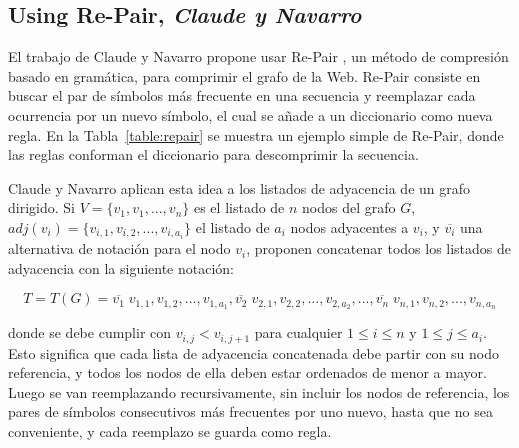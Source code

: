 \subsection{Using Re-Pair, \textit{Claude y Navarro}}
El trabajo de Claude y Navarro \cite{claude2010fast} propone usar Re-Pair \cite{larsson2000off}, un método de compresión basado en gramática, para comprimir el grafo de la Web. Re-Pair consiste en buscar el par de símbolos más frecuente en una secuencia y reemplazar cada ocurrencia por un nuevo símbolo, el cual se añade a un diccionario como nueva regla. En la Tabla~\ref{table:repair} se muestra un ejemplo simple de Re-Pair, donde las reglas conforman el diccionario para descomprimir la secuencia.



Claude y Navarro \cite{claude2010fast} aplican esta idea a los listados de adyacencia de un grafo dirigido. Si $V = \{v_{1}, v_{1}, ..., v_{n}\}$ es el listado de $n$ nodos del grafo $G$, $adj(v_{i}) = \{v_{i,1}, v_{i,2},... , v_{i,a_{i}}\}$ el listado de $a_{i}$ nodos adyacentes a $v_{i}$, y $\overline{v_{i}}$ una alternativa de notación para el nodo $v_{i}$, proponen concatenar todos los listados de adyacencia con la siguiente notación:

\begin{equation} \label{eq:RepairGrafo}
	T = T(G) = \overline{v_{1}} \; v_{1,1}, v_{1,2}, ..., v_{1,a_{1}}, \overline{v_{2}} \; v_{2,1}, v_{2,2}, ..., v_{2,a_{2}}, ..., \overline{v_{n}} \; v_{n,1}, v_{n,2}, ..., v_{n,a_{n}}
\end{equation}

\noindent donde se debe cumplir con $v_{i,j} < v_{i, j+1}$ para cualquier $1 \leq i \leq n$ y $1 \leq j \leq a_{i}$. Esto significa que cada lista de adyacencia concatenada debe partir con su nodo referencia, y todos los nodos de ella deben estar ordenados de menor a mayor. Luego se van reemplazando recursivamente, sin incluir los nodos de referencia, los pares de símbolos consecutivos más frecuentes por uno nuevo, hasta que no sea conveniente, y cada reemplazo se guarda como regla. 

